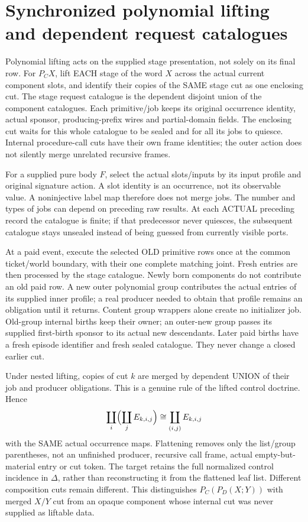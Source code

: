 \documentclass[11pt]{article}
\begin{document}
\section{Synchronized polynomial lifting and dependent request catalogues}
Polynomial lifting acts on the supplied stage presentation, not solely on its final row. For $P_C X$, lift EACH stage of the word $X$ across the actual current component slots, and identify their copies of the SAME stage cut as one enclosing cut. The stage request catalogue is the dependent disjoint union of the component catalogues. Each primitive/job keeps its original occurrence identity, actual sponsor, producing-prefix wires and partial-domain fields. The enclosing cut waits for this whole catalogue to be sealed and for all its jobs to quiesce. Internal procedure-call cuts have their own frame identities; the outer action does not silently merge unrelated recursive frames.

For a supplied pure body $F$, select the actual slots/inputs by its input profile and original signature action. A slot identity is an occurrence, not its observable value. A noninjective label map therefore does not merge jobs. The number and types of jobs can depend on preceding raw results. At each ACTUAL preceding record the catalogue is finite; if that predecessor never quiesces, the subsequent catalogue stays unsealed instead of being guessed from currently visible ports.

At a paid event, execute the selected OLD primitive rows once at the common ticket/world boundary, with their one complete matching joint. Fresh entries are then processed by the stage catalogue. Newly born components do not contribute an old paid row. A new outer polynomial group contributes the actual entries of its supplied inner profile; a real producer needed to obtain that profile remains an obligation until it returns. Content group wrappers alone create no initializer job. Old-group internal births keep their owner; an outer-new group passes its supplied first-birth sponsor to its actual new descendants. Later paid births have a fresh episode identifier and fresh sealed catalogue. They never change a closed earlier cut.

Under nested lifting, copies of cut $k$ are merged by dependent UNION of their job and producer obligations. This is a genuine rule of the lifted control doctrine. Hence
\[
  \coprod_i\Bigl(\coprod_j E_{k,i,j}\Bigr)
      \cong \coprod_{(i,j)}E_{k,i,j}
\]
with the SAME actual occurrence maps. Flattening removes only the list/group parentheses, not an unfinished producer, recursive call frame, actual empty-but-material entry or cut token. The target retains the full normalized control incidence in $\Delta$, rather than reconstructing it from the flattened leaf list. Different composition cuts remain different. This distinguishes $P_C(P_D(X;Y))$ with merged $X/Y$ cut from an opaque component whose internal cut was never supplied as liftable data.
\end{document}
